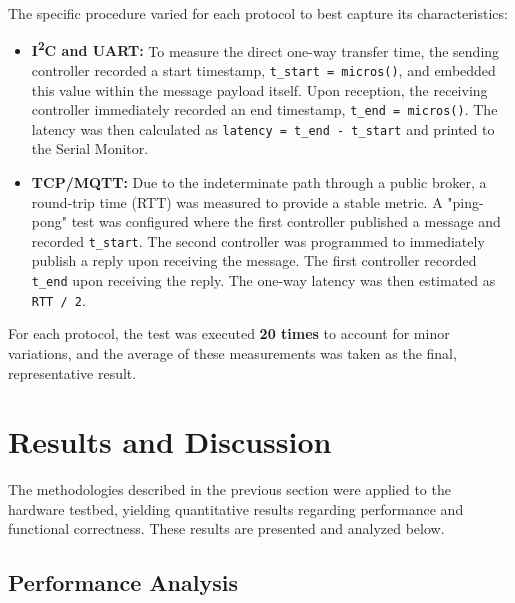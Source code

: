 The specific procedure varied for each protocol to best capture its characteristics:
\begin{itemize}
    \item \textbf{I\textsuperscript{2}C and UART:} To measure the direct one-way transfer time, the sending controller recorded a start timestamp, \texttt{t\_start = micros()}, and embedded this value within the message payload itself. Upon reception, the receiving controller immediately recorded an end timestamp, \texttt{t\_end = micros()}. The latency was then calculated as \texttt{latency = t\_end - t\_start} and printed to the Serial Monitor.

    \item \textbf{TCP/MQTT:} Due to the indeterminate path through a public broker, a round-trip time (RTT) was measured to provide a stable metric. A "ping-pong" test was configured where the first controller published a message and recorded \texttt{t\_start}. The second controller was programmed to immediately publish a reply upon receiving the message. The first controller recorded \texttt{t\_end} upon receiving the reply. The one-way latency was then estimated as \texttt{RTT / 2}.
\end{itemize}
For each protocol, the test was executed \textbf{20 times} to account for minor variations, and the average of these measurements was taken as the final, representative result.


\section{Results and Discussion}
\label{sec:results_and_discussion}

The methodologies described in the previous section were applied to the hardware testbed, yielding quantitative results regarding performance and functional correctness. These results are presented and analyzed below.

\subsection{Performance Analysis}
\label{subsec:performance_results}
 
